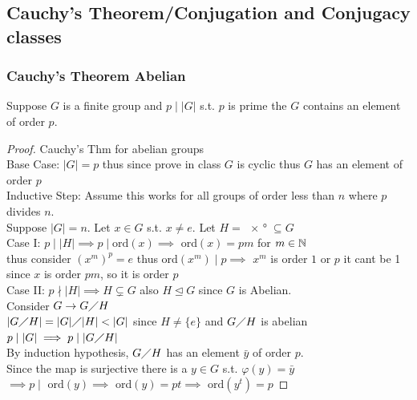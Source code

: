 \subsection{Cauchy's Theorem/Conjugation and Conjugacy classes}
\subsubsection{Cauchy's Theorem Abelian}
\begin{theorem}
    Suppose $G$ is a finite group and $p \mid |G|$ s.t. $p$ is prime the $G$ contains an element of order $p$.
\end{theorem}
\begin{proof}
    Cauchy's Thm for abelian groups\\
    Base Case: $|G|=p$ thus since prove in class $G$ is cyclic thus $G$ has an element of order $p$\\
    Inductive Step: Assume this works for all groups of order less than $n$ where $p$ divides $n$.\\
    Suppose $|G|=n$. Let $x \in G$ s.t. $x \neq e$. Let $H=\ang{x}\subseteq G$\\
    Case I: $p \mid |H| \implies p \mid \text{ord}(x) \implies$ ord$(x)=pm$ for $m \in \mathbb{N}$\\ 
    thus consider $(x^{m})^p=e$ thus ord$(x^m) \mid p \implies$ $x^m$ is order $1$ or $p$ it cant be 1 since $x$ is order $pm$, so it is order $p$\\
    Case II: $p \nmid |H| \implies H \subsetneq G$ also $H \unlhd G$ since $G$ is Abelian.\\
    Consider $G \rightarrow G \diagup H$\\
    $|G \diagup H|=|G| \diagup |H| < |G|$ since $H \neq \{e\}$ and $G \diagup H$ is abelian\\
    $p \mid |G| \implies p \mid |G \diagup H|$\\
    By induction hypothesis, $G \diagup H$ has an element $\bar{y}$ of order $p$.\\
    Since the map is surjective there is a $y \in G$ s.t. $\varphi(y)=\bar{y}$\\
    $\implies p \mid \text{ ord}(y) \implies$ ord$(y)=pt \implies \text{ ord}(y^t)=p$
\end{proof}

